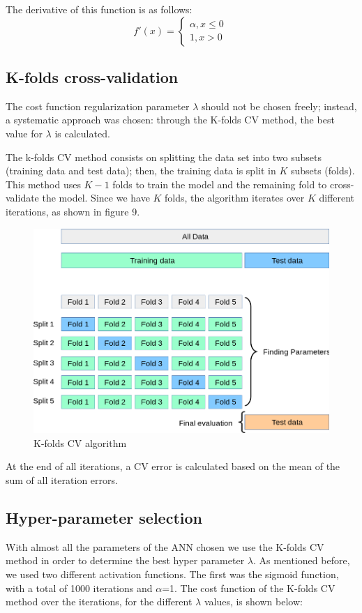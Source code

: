 \documentclass[conference]{IEEEtran}
\begin{document}
The derivative of this function is as follows:
\begin{equation}
    f'(x) = 
    \begin{cases}
      \alpha   , x \leq 0 \\ 
      1 ,  x > 0
    \end{cases}\,
\end{equation}

\subsection{K-folds cross-validation}
The cost function regularization parameter $\lambda$ should not be chosen freely; instead, a systematic approach was chosen: through the K-folds CV method, the best value for $\lambda$ is calculated.
\par The k-folds CV method consists on splitting the data set into two subsets (training data and test data); then, the training data is split in $K$ subsets (folds). This method uses $K-1$ folds to train the model and the remaining fold to cross-validate the model. Since we have $K$ folds, the algorithm iterates over $K$ different iterations\cite{b6}, as shown in figure 9.\cite{b5} 
\begin{figure}[H]
\centering
\includegraphics[scale=0.25]{kfolds.png}
\caption{K-folds CV algorithm}
\label{fig:kfolds}
\end{figure}

\par At the end of all iterations, a CV error is calculated based on the mean of the sum of all iteration errors.


\subsection{Hyper-parameter selection}
With almost all the parameters of the ANN chosen we use the K-folds CV method in order to determine the best hyper parameter $\lambda$. As mentioned before, we used two different activation functions. The first was the sigmoid function, with a total of 1000 iterations and $\alpha$=1. The cost function of the K-folds CV method over the iterations, for the different $\lambda$ values, is shown below:
\end{document}
